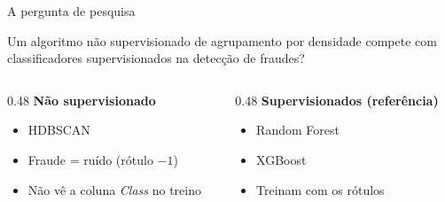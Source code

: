 \documentclass[aspectratio=169,11pt]{beamer}
\begin{document}
\begin{frame}{A pergunta de pesquisa}

    \begin{center}
    \large
    Um algoritmo não supervisionado de agrupamento por densidade compete com
    classificadores supervisionados na detecção de fraudes?
    \end{center}

    \bigskip
    \begin{columns}[t]
        \begin{column}{0.48\textwidth}
            \textbf{Não supervisionado}
            \begin{itemize}
                \item HDBSCAN
                \item Fraude = ruído (rótulo $-1$)
                \item Não vê a coluna \textit{Class} no treino
            \end{itemize}
        \end{column}
        \begin{column}{0.48\textwidth}
            \textbf{Supervisionados (referência)}
            \begin{itemize}
                \item Random Forest
                \item XGBoost
                \item Treinam com os rótulos
            \end{itemize}
        \end{column}
    \end{columns}

\end{frame}
\end{document}

